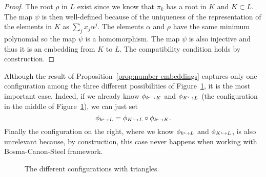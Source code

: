   \begin{proof}
    The root $\rho$ in $L$ exist since we know that $\pi_k$ has a root in $K$
    and $K\subset L$. The map $\psi$ is then well-defined because of the uniqueness of the
    representation of the elements in $K$ as $\sum_jx_j\alpha^j$. The elements
    $\alpha$ and $\rho$ have the same minimum polynomial so the map $\psi$ is a
    homomorphism. The map $\psi$ is also injective and thus it is an embedding
    from $K$ to $L$. The compatibility condition holds by construction.
  \end{proof}
  Although the result of Proposition~\ref{prop:number-embeddings} captures only
  one configuration among the three different possibilities of
  Figure~\ref{fig:triangles}, it is the most important case. Indeed, if we
  already know $\phi_{k\hookrightarrow K}$ and $\phi_{K\hookrightarrow L}$ (the configuration in the
  middle of Figure~\ref{fig:triangles}), we can just set
  \[
    \phi_{k\hookrightarrow L} = \phi_{K\hookrightarrow L}\circ\phi_{k\hookrightarrow K}.
  \]
  Finally the configuration on the right, where we know $\phi_{k\hookrightarrow L}$ and
  $\phi_{K\hookrightarrow L}$, is also unrelevant because, by construction, this case never
  happens when working with Bosma-Canon-Steel framework.
    \begin{figure}
    \centering
    \phantom{and}
    \phantom{and}
    \caption{The different configurations with triangles.}
    \label{fig:triangles}
  \end{figure}

